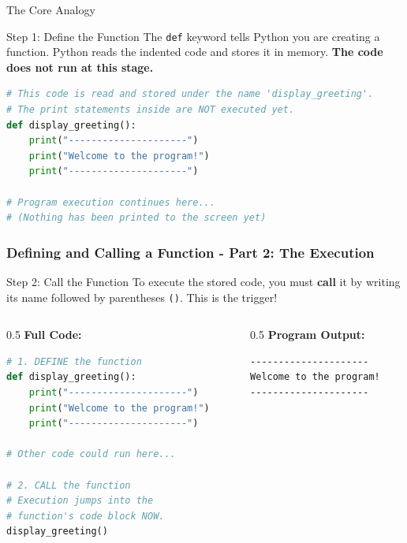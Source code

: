 \documentclass{beamer}
\begin{document}
\begin{frame}[fragile]
\begin{block}{The Core Analogy}
\begin{frame}[fragile]
    \begin{block}{Step 1: Define the Function}
        The \texttt{def} keyword tells Python you are creating a function. Python reads the indented code and stores it in memory. \textbf{The code does not run at this stage.}
    \end{block}
    
    \begin{lstlisting}[language=Python]
# This code is read and stored under the name 'display_greeting'.
# The print statements inside are NOT executed yet.
def display_greeting():
    print("---------------------")
    print("Welcome to the program!")
    print("---------------------")

# Program execution continues here...
# (Nothing has been printed to the screen yet)
    \end{lstlisting}

\end{frame}

\begin{frame}[fragile]
    \frametitle{Defining and Calling a Function - Part 2: The Execution}
    
    \begin{block}{Step 2: Call the Function}
        To execute the stored code, you must \textbf{call} it by writing its name followed by parentheses \texttt{()}. This is the trigger!
    \end{block}

    \begin{columns}[T]
        \begin{column}{0.5\textwidth}
            \textbf{Full Code:}
            \begin{lstlisting}[language=Python]
# 1. DEFINE the function
def display_greeting():
    print("---------------------")
    print("Welcome to the program!")
    print("---------------------")

# Other code could run here...

# 2. CALL the function
# Execution jumps into the
# function's code block NOW.
display_greeting()
            \end{lstlisting}
        \end{column}
        \begin{column}{0.5\textwidth}
            \textbf{Program Output:}
            \begin{verbatim}
---------------------
Welcome to the program!
---------------------
            \end{verbatim}
            

\end{column}
\end{columns}
\end{frame}
\end{block}
\end{frame}
\end{document}
